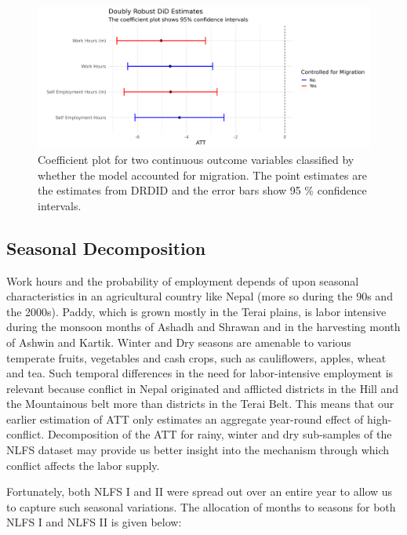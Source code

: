 \documentclass[12pt,a4paper]{article}
\begin{document}
\begin{figure}[H]
	\centering
	\includegraphics[width=1\textwidth]{../Analysis files/coefplot_2.jpg}
	\caption{Coefficient plot for two continuous outcome variables classified by whether the model accounted for migration. The point estimates are the estimates from DRDID and the error bars show 95 \% confidence intervals.}
	\label{fig:coefplot_1_2}
\end{figure}


\subsection{Seasonal Decomposition}
Work hours and the probability of employment depends of upon seasonal characteristics in an agricultural country like Nepal (more so during the 90s and the 2000s). Paddy, which is grown mostly in the Terai plains, is labor intensive during the monsoon months of Ashadh and Shrawan and in the harvesting month of Ashwin and Kartik. Winter and Dry seasons are amenable to various temperate fruits, vegetables and cash crops, such as cauliflowers, apples, wheat and tea. Such temporal differences in the need for labor-intensive employment is relevant because conflict in Nepal originated and afflicted districts in the Hill and the Mountainous belt more than districts in the Terai Belt\parencite{do2010geography}. This means that our earlier estimation of ATT only estimates an aggregate year-round effect of high-conflict. Decomposition of the ATT for rainy, winter and dry sub-samples of the NLFS dataset may provide us better insight into the mechanism through which conflict affects the labor supply.

Fortunately, both NLFS I and II were spread out over an entire year to allow us to capture such seasonal variations. The allocation of months to seasons for both NLFS I and NLFS II is given below:
\end{document}
